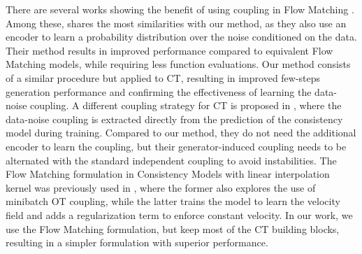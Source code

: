 There are several works showing the benefit of using coupling in Flow Matching \citep{pooladian2023multisample, tong2023conditional, liu2023flow, lee2023minimizing, albergostochastic, kim2024simple}. Among these, \citep{lee2023minimizing} shares the most similarities with our method, as they also use an encoder to learn a probability distribution over the noise conditioned on the data. Their method results in improved performance compared to equivalent Flow Matching models, while requiring less function evaluations. Our method consists of a similar procedure but applied to CT, resulting in improved few-steps generation performance and confirming the effectiveness of learning the data-noise coupling. A different coupling strategy for CT is proposed in \citep{issenhuth2024improving}, where the data-noise coupling is extracted directly from the prediction of the consistency model during training. Compared to our method, they do not need the additional encoder to learn the coupling, but their generator-induced coupling needs to be alternated with the standard independent coupling to avoid instabilities. The Flow Matching formulation in Consistency Models with linear interpolation kernel was previously used in \citep{douunified, yang2024consistency}, where the former also explores the use of minibatch OT coupling, while the latter trains the model to learn the velocity field and adds a regularization term to enforce constant velocity. In our work, we use the Flow Matching formulation, but keep most of the CT building blocks, resulting in a simpler formulation with superior performance.